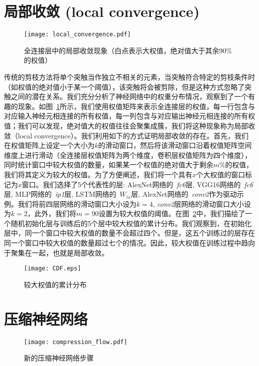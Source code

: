 \section{局部收敛 (local convergence)}

\begin{figure}[h]
  \centering
  \texttt{[image: local\_convergence.pdf]}
  \caption{全连接层中的局部收敛现象（白点表示大权值，绝对值大于其余$90\%$的权值）}
  \label{fig:local_convergence}
\end{figure}

传统的剪枝方法将单个突触当作独立不相关的元素，当突触符合特定的剪枝条件时（如权值的绝对值小于某一个阈值），该突触将会被剪除，但是这种方式忽略了突触之间的潜在关系。我们充分分析了神经网络中的权重分布情况，观察到了一个有趣的现象。如图~\ref{fig:local_convergence}所示，我们使用权值矩阵来表示全连接层的权值，每一行包含与对应输入神经元相连接的所有权值，每一列包含与对应输出神经元相连接的所有权值；我们可以发现，绝对值大的权值往往会聚集成簇，我们将这种现象称为局部收敛（local convergence）。我们利用如下的方式证明局部收敛的存在。首先，我们在权值矩阵上设定一个大小为$k$的滑动窗口，然后将该滑动窗口沿着权值矩阵空间维度上进行滑动（全连接层权值矩阵为两个维度，卷积层权值矩阵为四个维度），同时统计窗口中较大权值的数量，如果某一个权值的绝对值大于剩余$m\%$的权值，我们将其定义为较大的权值。为了方便阐述，我们将一个具有$x$个大权值的窗口标记为$x$窗口。我们选择了5个代表性的层: AlexNet网络的~\emph{fc6}层, VGG16网络的~\emph{fc6}层, MLP网络的~\emph{ip1}层, LSTM网络的~\emph{$W_{ix}$}层, AlexNet网络的~\emph{conv2}作为驱动示例。我们将前四层网络的滑动窗口大小设为$k = 4$, \emph{conv2}层网络的滑动窗口大小设为$k = 2$，此外，我们将$m = 90$设置为较大权值的阈值。在图~\ref{fig:cdf}中，我们描绘了一个随机初始化层与训练后的5个层中较大权值的累计分布。我们观察到，在初始化层中，同一个窗口中较大权值的数量不会超过四个。但是，这五个训练过的层存在同一个窗口中较大权值的数量超过七个的情况。因此，较大权值在训练过程中趋向于聚集在一起，也就是局部收敛。

\begin{figure}[t]
\centering
\texttt{[image: CDF.eps]}
\caption{较大权值的累计分布}
\label{fig:cdf}
\end{figure}

\section{压缩神经网络}

\begin{figure}[h]
\centering
\texttt{[image: compression\_flow.pdf]}
\caption{新的压缩神经网络步骤}
\label{fig:compression_flow}
\end{figure}

